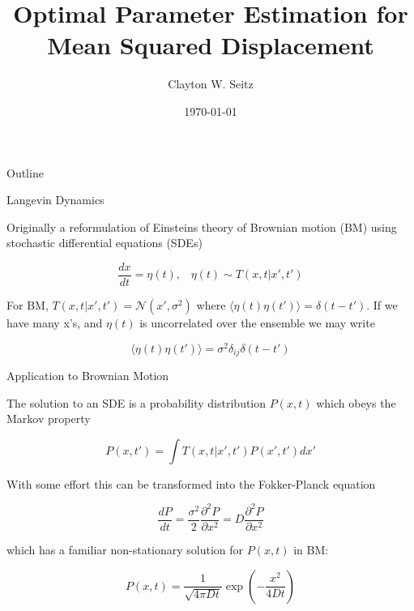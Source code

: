 \documentclass{beamer}					%
\title{Optimal Parameter Estimation for Mean Squared Displacement}	%
\author{Clayton W. Seitz}								%
\date{\today}									%
\begin{document}
\begin{frame}
  \titlepage
\end{frame}

\begin{frame}{Outline}
  \tableofcontents
\end{frame}

\begin{frame}{Langevin Dynamics}

Originally a reformulation of Einsteins theory of Brownian motion (BM) using stochastic differential equations (SDEs)

\begin{equation*}
\frac{dx}{dt} = \eta(t), \;\;\; \eta(t) \sim T(x,t|x',t')
\end{equation*}

For BM, $T(x,t|x',t') = \mathcal{N}(x',\sigma^{2})$ where $\langle \eta(t)\eta(t')\rangle = \delta(t-t')$. If we have many x's, and $\eta(t)$ is uncorrelated over the ensemble we may write 

\begin{equation*}
\langle \eta(t)\eta(t')\rangle = \sigma^{2}\delta_{ij}\delta(t-t')
\end{equation*}

\end{frame}

\begin{frame}{Application to Brownian Motion}

The solution to an SDE is a probability distribution $P(x,t)$ which obeys the Markov property

\begin{equation*}
P(x,t') = \int T(x,t|x',t')P(x',t')dx'
\end{equation*}


With some effort this can be transformed into the Fokker-Planck equation

\begin{equation*}
\frac{dP}{dt} = \frac{\sigma^{2}}{2}\frac{\partial^{2}P}{\partial x^{2}} = D\frac{\partial^{2}P}{\partial x^{2}}
\end{equation*}

which has a familiar non-stationary solution for $P(x,t)$ in BM:

\begin{equation*}
P(x,t) = \frac{1}{\sqrt{4\pi Dt}}\exp\left(-\frac{x^{2}}{4Dt}\right)
\end{equation*}

\end{frame}
\end{document}
